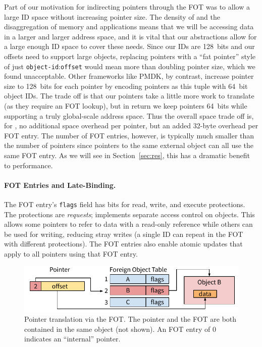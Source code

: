 Part of our motivation for indirecting pointers through the FOT was to allow a large ID space
without increasing pointer size. The density of \NVM and the disaggregation of memory and
applications means that we will be accessing data in a larger and larger address space, and it is
vital that our abstractions allow for a large enough ID space to cover these needs. Since our IDs
are 128~bits and our offsets need to support large objects, replacing pointers with a ``fat
pointer'' style of just \texttt{object-id}:\texttt{offset} would mean more than doubling pointer
size, which we found unacceptable. Other frameworks like PMDK, by contrast, increase pointer size to 128~bits for each
pointer by encoding pointers as this tuple with 64~bit object IDs. The trade off is that our
pointers take a little more work to translate (as they require an FOT lookup), but in return we keep
pointers 64~bits while supporting a truly global-scale address space. Thus the overall space trade off is, for \Twizzler, no additional space overhead
per pointer, but an added 32-byte overhead per FOT entry.
The number of FOT entries, however, is typically much smaller than the number of
pointers since pointers to the same external object can all use the same FOT entry. As we will see
in Section~\ref{sec:res}, this has a dramatic benefit to performance.


\paragraph{FOT Entries and Late-Binding.}

The FOT entry's \texttt{flags} field has bits for read, write, and execute protections. The
protections are \textit{requests}; \Twizzler implements separate access control on objects.
This allows some pointers to refer to data with a read-only reference while others can be used for
writing, reducing stray writes (a single ID can repeat in the FOT with different protections).
The FOT entries also enable atomic updates that apply to all pointers using
that FOT entry.

\begin{figure}
    \includegraphics[width=\linewidth]{fig/ptrfot}
    \caption{Pointer translation via the FOT\@.
        The pointer and the FOT
        are both contained in the same object (not shown). An FOT entry of $0$ indicates an ``internal''
        pointer.
    }
    \label{fig:fottran}
\end{figure}

